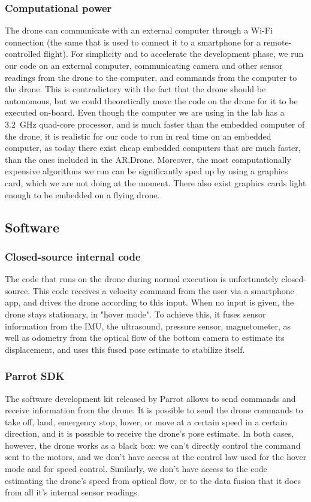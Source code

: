 \subsubsection{Computational power}
The drone can communicate with an external computer through a Wi-Fi connection (the same that is used to connect it to a smartphone for a remote-controlled flight). For simplicity and to accelerate the development phase, we run our code on an external computer, communicating camera and other sensor readings from the drone to the computer, and commands from the computer to the drone. This is contradictory with the fact that the drone should be autonomous, but we could theoretically move the code on the drone for it to be executed on-board. Even though the computer we are using in the lab has a \SI{3.2}{\giga\hertz} quad-core processor, and is much faster than the embedded computer of the drone, it is realistic for our code to run in real time on an embedded computer, as today there exist cheap embedded computers that are much faster, than the ones included in the AR.Drone. Moreover, the most computationally expensive algorithms we run can be significantly sped up by using a graphics card, which we are not doing at the moment. There also exist graphics cards light enough to be embedded on a flying drone.

\subsection{Software}

\subsubsection{Closed-source internal code}\label{sec:closedsource}
The code that runs on the drone during normal execution is unfortunately closed-source. This code receives a velocity command from the user via a smartphone app, and drives the drone according to this input. When no input is given, the drone stays stationary, in "hover mode". To achieve this, it fuses sensor information from the IMU, the ultrasound, pressure sensor, magnetometer, as well as odometry from the optical flow of the bottom camera to estimate its displacement, and uses this fused pose estimate to stabilize itself.

\subsubsection{Parrot SDK}
The software development kit released by Parrot allows to send commands and receive information from the drone. It is possible to send the drone commands to take off, land, emergency stop, hover, or move at a certain speed in a certain direction, and it is possible to receive the drone's pose estimate. In both cases, however, the drone works as a black box: we can't directly control the command sent to the motors, and we don't have access at the control law used for the hover mode and for speed control. Similarly, we don't have access to the code estimating the drone's speed from optical flow, or to the data fusion that it does from all it's internal sensor readings.

